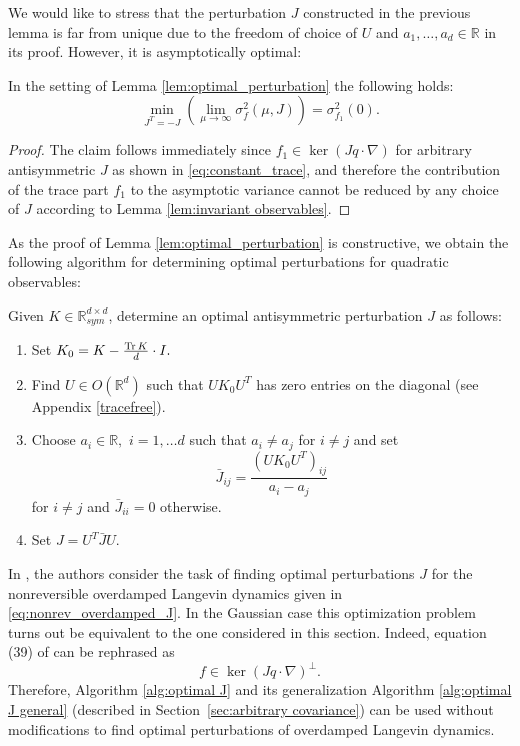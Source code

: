 We would like to stress that the perturbation $J$ constructed in the previous lemma is far from unique due to the freedom of choice of $U$ and $a_1,\ldots,a_d \in \mathbb{R}$ in its proof. However, it is asymptotically optimal:
\begin{corollary}
	\label{cor:optimality}
	In the setting of Lemma \ref{lem:optimal_perturbation} the following holds:
	\[
	\min_{J^T=-J}\left(\lim_{\mu\rightarrow\infty} \sigma^2_{f}(\mu,J)\right)=\sigma^2_{f_1}(0).
	\]
\end{corollary}
\begin{proof}
	The claim follows immediately since $f_{1}\in\ker(Jq\cdot\nabla)$ for arbitrary antisymmetric $J$ as shown in \eqref{eq:constant_trace}, and therefore the contribution of the trace part $f_1$ to the asymptotic variance cannot be reduced by any choice of $J$ according to Lemma \ref{lem:invariant observables}.	
\end{proof}
As the proof of Lemma \ref{lem:optimal_perturbation} is constructive, we obtain the following algorithm for determining optimal perturbations for quadratic observables:
\begin{algorithm}
	\label{alg:optimal J}
	Given $K\in\mathbb{R}_{sym}^{d\times d}$,
	determine an optimal antisymmetric perturbation $J$ as follows:
	\begin{enumerate}
		\item Set $K_{0}=K-\frac{\operatorname{Tr} K}{d}\cdot I.$
		\item Find $U\in O(\mathbb{R}^{d})$ such that $UK_{0}U^{T}$ has zero entries
		on the diagonal (see Appendix \ref{tracefree}).
		\item Choose $a_{i}\in\mathbb{R},$ $i=1,\ldots d$ such that $a_{i}\neq a_{j}$
		for $i\neq j$ and set 
		\[
		\bar{J}_{ij}=\frac{(UK_{0}U^{T})_{ij}}{a_{i}-a_{j}}
		\]
		for $i\ne j$ and $\bar{J}_{ii}=0$ otherwise.
		\item
		Set $J=U^{T}\bar{J}U$.
	\end{enumerate}
\end{algorithm}
\begin{remark}
	In \cite{duncan2016variance}, the authors consider the task of finding optimal perturbations $J$ for the nonreversible overdamped Langevin dynamics given in \eqref{eq:nonrev_overdamped_J}. In the Gaussian case this optimization problem turns out be equivalent to the one considered in this section. Indeed, equation (39) of \cite{duncan2016variance} can be rephrased as 
	\begin{equation*}
	f \in \ker(Jq\cdot \nabla)^{\perp}.
	\end{equation*}
	Therefore, Algorithm \ref{alg:optimal J} and its generalization Algorithm \ref{alg:optimal J general} (described in Section~\ref{sec:arbitrary covariance})  can be used without modifications to find optimal perturbations of overdamped Langevin dynamics.
\end{remark}

